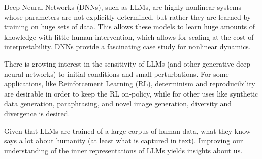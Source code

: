 \documentclass[a4paper,12pt]{article}
\begin{document}
Deep Neural Networks (DNNs), such as LLMs, are highly nonlinear systems whose parameters are not explicitly determined, but rather they are learned by training on huge sets of data.
This allows these models to learn huge amounts of knowledge with little human intervention, which allows for scaling at the cost of interpretability.
DNNs provide a fascinating case study for nonlinear dynamics.

There is growing interest in the sensitivity of LLMs (and other generative deep neural networks) to initial conditions and small perturbations. For some applications, like Reinforcement Learning (RL), determinism and reproducibility are desirable in order to keep the RL on-policy, while for other uses like synthetic data generation, paraphrasing, and novel image generation, diversity and divergence is desired.

Given that LLMs are trained of a large corpus of human data, what they know says a lot about humanity (at least what is captured in text). Improving our understanding of the inner representations of LLMs yields insights about us.

\end{document}
